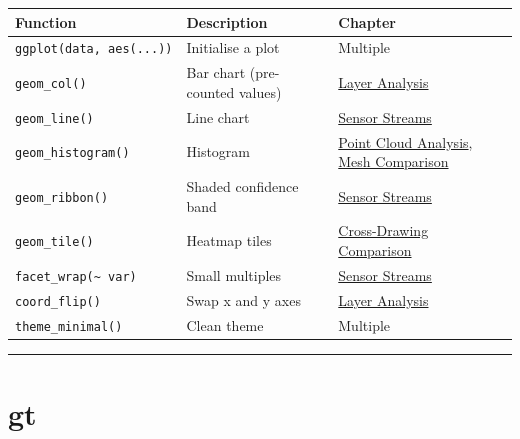 \documentclass[
  11pt,
  letterpaper,
  DIV=11,
  numbers=noendperiod]{scrreprt}
\begin{document}
\begin{longtable}[]{@{}
  >{\raggedright\arraybackslash}p{}
  >{\raggedright\arraybackslash}p{}
  >{\raggedright\arraybackslash}p{}@{}}
\toprule\noalign{}
\begin{minipage}[b]{\linewidth}\raggedright
Function
\end{minipage} & \begin{minipage}[b]{\linewidth}\raggedright
Description
\end{minipage} & \begin{minipage}[b]{\linewidth}\raggedright
Chapter
\end{minipage} \\
\midrule\noalign{}
\endhead
\bottomrule\noalign{}
\endlastfoot
\texttt{ggplot(data,\ aes(...))} & Initialise a plot & Multiple \\
\texttt{geom\_col()} & Bar chart (pre-counted values) &
\hyperref[layer-structure-analysis]{Layer Analysis} \\
\texttt{geom\_line()} & Line chart &
\hyperref[linking-sensor-streams]{Sensor Streams} \\
\texttt{geom\_histogram()} & Histogram &
\hyperref[point-cloud-analysis]{Point Cloud Analysis},
\hyperref[mesh-comparison]{Mesh Comparison} \\
\texttt{geom\_ribbon()} & Shaded confidence band &
\hyperref[linking-sensor-streams]{Sensor Streams} \\
\texttt{geom\_tile()} & Heatmap tiles &
\hyperref[cross-drawing-comparison]{Cross-Drawing Comparison} \\
\texttt{facet\_wrap(\textasciitilde{}\ var)} & Small multiples &
\hyperref[linking-sensor-streams]{Sensor Streams} \\
\texttt{coord\_flip()} & Swap x and y axes &
\hyperref[layer-structure-analysis]{Layer Analysis} \\
\texttt{theme\_minimal()} & Clean theme & Multiple \\
\end{longtable}

\begin{center}\rule{0.5\linewidth}{0.5pt}\end{center}

\section{gt}\label{gt}
\end{document}
